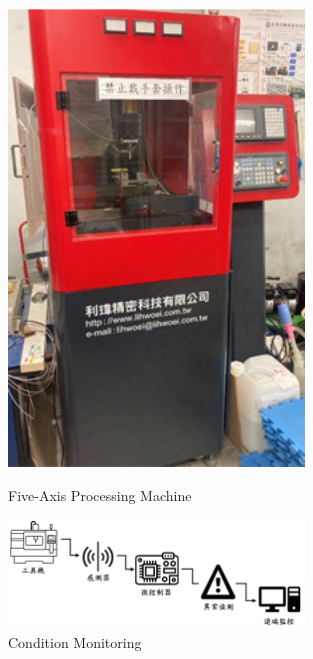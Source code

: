 \documentclass[10pt, letterpaper]{article}
\begin{document}
\begin{figure}[htbp]
\begin{minipage}[c]{0.33\linewidth}
            \includegraphics[width=0.7\textwidth]{fig/Numerical Analysis/五軸加工機.png}
            \caption{Five-Axis Processing Machine}
        \end{minipage}%
        \begin{minipage}[c]{0.33\linewidth}
            \centering
            \includegraphics[width=0.7\textwidth]{fig/Numerical Analysis/狀態監控流程圖.png}
            \caption{Condition Monitoring}
        \end{minipage}

        \vspace{0.9cm}


\end{figure}
\end{document}
